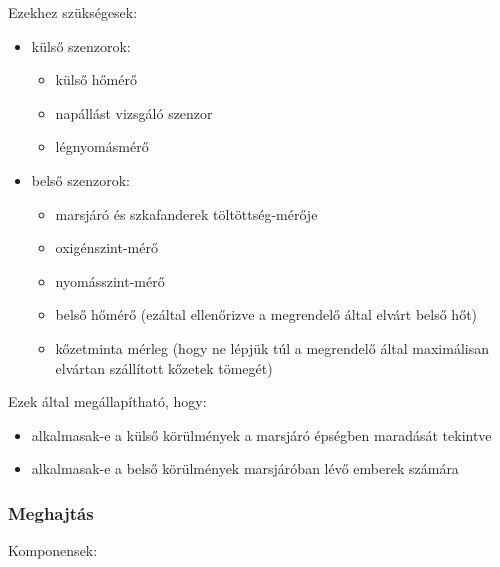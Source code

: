 \documentclass[12pt]{report}
\begin{document}
Ezekhez szükségesek:
\begin{itemize}
  \item külső szenzorok: \begin{itemize}
      \item {} külső hőmérő
      \item {} napállást vizsgáló szenzor
      \item {} légnyomásmérő
    \end{itemize}
  \item belső szenzorok: \begin{itemize}
      \item {} marsjáró és szkafanderek töltöttség-mérője
      \item {} oxigénszint-mérő
      \item {} nyomásszint-mérő
      \item {} belső hőmérő (ezáltal ellenőrizve a megrendelő által elvárt belső hőt)
      \item {} kőzetminta mérleg (hogy ne lépjük túl a megrendelő által maximálisan elvártan szállított kőzetek tömegét)
    \end{itemize}
\end{itemize}

Ezek által megállapítható, hogy:
\begin{itemize}
  \item alkalmasak-e a külső körülmények a marsjáró épségben maradását tekintve
  \item alkalmasak-e a belső körülmények marsjáróban lévő emberek számára
\end{itemize}

\subsubsection{Meghajtás}

Komponensek:
\end{document}

